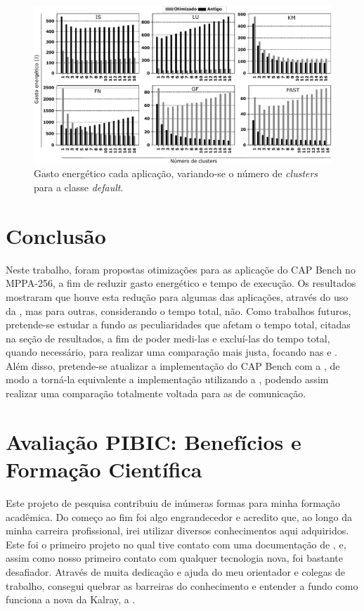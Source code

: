\documentclass[a4paper,11pt]{article}
\newcommand{\mppa}{MPPA-256\xspace}
\newcommand{\capb}{CAP Bench\xspace}
\begin{document}
\begin{figure}[t]
\centering
\includegraphics[width=15cm, keepaspectratio]{figs/power.pdf}
\caption{Gasto energético cada aplicação, variando-se o número de \textit{clusters} para a classe \textit{default}.}\par
\label{fig:executiontime}
\end{figure}

\section{Conclusão}
\label{sec:conclusao}

Neste trabalho, foram propostas otimizações para as aplicaçõe do \capb no \mppa, a fim de reduzir gasto energético e tempo de execução. Os resultados mostraram que houve esta redução para algumas das aplicações, através do uso da \async, mas para outras, considerando o tempo total, não. Como trabalhos futuros, pretende-se estudar a fundo as peculiaridades que afetam o tempo total, citadas na seção de resultados, a fim de poder medi-las e excluí-las do tempo total, quando necessário, para realizar uma comparação mais justa, focando nas \apis \async e \ipc. Além disso, pretende-se atualizar a implementação do \capb com a \api \ipc, de modo a torná-la equivalente a implementação utilizando a \async, podendo assim realizar uma comparação totalmente voltada para as \apis de comunicação.

\section{Avaliação PIBIC: Benefícios e Formação Científica}

Este projeto de pesquisa contribuiu de inúmeras formas para minha formação acadêmica. Do começo ao fim foi algo engrandecedor e acredito que, ao longo da minha carreira profissional, irei utilizar diversos conhecimentos aqui adquiridos. Este foi o primeiro projeto no qual tive contato com uma documentação de \api, e, assim como nosso primeiro contato com qualquer tecnologia nova, foi bastante desafiador. Através de muita dedicação e ajuda do meu orientador e colegas de trabalho, consegui quebrar as barreiras do conhecimento e entender a fundo como funciona a nova \api da Kalray, a \async.  
\end{document}
